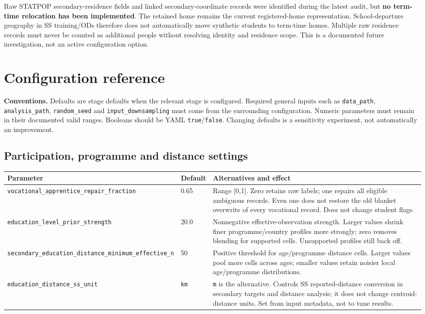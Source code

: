 \documentclass[11pt,a4paper]{article}
\newcommand{\code}[1]{\nolinkurl{#1}}
\begin{document}
Raw STATPOP secondary-residence fields and linked secondary-coordinate records
were identified during the latest audit, but \textbf{no term-time relocation
has been implemented}. The retained home remains the current registered-home
representation. School-departure geography in SS training/ODs therefore does
not automatically move synthetic students to term-time homes. Multiple raw
residence records must never be counted as additional people without resolving
identity and residence scope. This is a documented future investigation, not
an active configuration option.

\section{Configuration reference}
\label{sec:config}

\textbf{Conventions.} Defaults are stage defaults when the relevant stage is
configured. Required general inputs such as \code{data_path},
\code{analysis_path}, \code{random_seed} and \code{input_downsampling} must
come from the surrounding configuration. Numeric parameters must remain in
their documented valid ranges. Booleans should be YAML \code{true}/\code{false}.
Changing defaults is a sensitivity experiment, not automatically an improvement.

\subsection{Participation, programme and distance settings}
\small
\begin{longtable}{L{.34\textwidth}L{.13\textwidth}L{.45\textwidth}}
\toprule Parameter & Default & Alternatives and effect \\
\midrule\endhead
\code{vocational_apprentice_repair_fraction} & 0.65 & Range [0,1]. Zero retains
raw labels; one repairs all eligible ambiguous records. Even one does not
restore the old blanket overwrite of every vocational record. Does not change student flags. \\
\code{education_level_prior_strength} & 20.0 & Nonnegative effective-observation
strength. Larger values shrink finer programme/country profiles more strongly;
zero removes blending for supported cells. Unsupported profiles still back off. \\
\code{secondary_education_distance_minimum_effective_n} & 50 & Positive threshold
for age/programme distance cells. Larger values pool more cells across ages;
smaller values retain noisier local age/programme distributions. \\
\code{education_distance_ss_unit} & \code{km} & \code{m} is the alternative.
Controls SS reported-distance conversion in secondary targets and distance
analysis; it does not change centroid-distance units. Set from input metadata,
not to tune results. \\
\bottomrule
\end{longtable}
\normalsize
\end{document}
